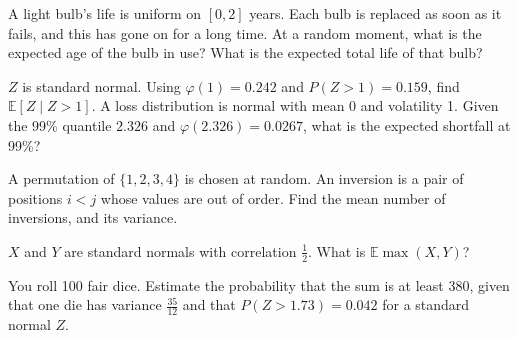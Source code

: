 \begin{question}\label{iq:iv1:timed-test-7:8}
A light bulb's life is uniform on $[0, 2]$ years. Each bulb is replaced as soon as it fails, and this has gone on for a long time. At a random moment, what is the expected age of the bulb in use? What is the expected total life of that bulb?
\end{question}

\begin{question}\label{iq:iv1:timed-test-7:9}
$Z$ is standard normal. Using $\varphi(1) = 0.242$ and $P(Z > 1) = 0.159$, find $\mathbb{E}[Z \mid Z > 1]$. A loss distribution is normal with mean 0 and volatility 1. Given the 99\% quantile $2.326$ and $\varphi(2.326) = 0.0267$, what is the expected shortfall at 99\%?
\end{question}

\begin{question}\label{iq:iv1:timed-test-7:10}
A permutation of $\{1, 2, 3, 4\}$ is chosen at random. An inversion is a pair of positions $i < j$ whose values are out of order. Find the mean number of inversions, and its variance.
\end{question}

\begin{question}\label{iq:iv1:timed-test-7:11}
$X$ and $Y$ are standard normals with correlation $\frac12$. What is $\mathbb{E}\max(X, Y)$?
\end{question}

\begin{question}\label{iq:iv1:timed-test-7:12}
You roll 100 fair dice. Estimate the probability that the sum is at least 380, given that one die has variance $\frac{35}{12}$ and that $P(Z > 1.73) = 0.042$ for a standard normal $Z$.
\end{question}
